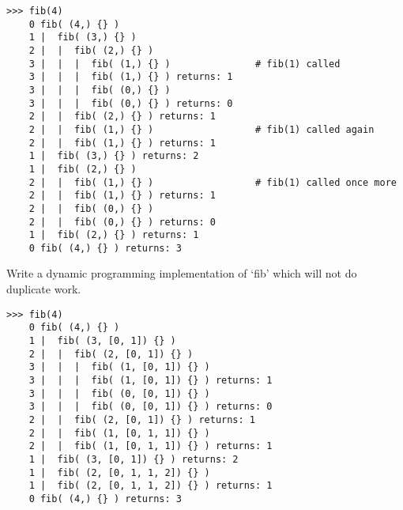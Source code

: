 \documentclass[11pt]{article}
\newenvironment{answer}{\large\lstset{basicstyle=\large}\color{white}}{}
\newenvironment{answer}{\large\lstset{basicstyle=\large}\color{red}}{}
\begin{document}
\begin{enumerate}
\begin{verbatim}
>>> fib(4)
    0 fib( (4,) {} )
    1 |  fib( (3,) {} )
    2 |  |  fib( (2,) {} )
    3 |  |  |  fib( (1,) {} )               # fib(1) called
    3 |  |  |  fib( (1,) {} ) returns: 1
    3 |  |  |  fib( (0,) {} )
    3 |  |  |  fib( (0,) {} ) returns: 0
    2 |  |  fib( (2,) {} ) returns: 1
    2 |  |  fib( (1,) {} )                  # fib(1) called again
    2 |  |  fib( (1,) {} ) returns: 1
    1 |  fib( (3,) {} ) returns: 2
    1 |  fib( (2,) {} )
    2 |  |  fib( (1,) {} )                  # fib(1) called once more
    2 |  |  fib( (1,) {} ) returns: 1
    2 |  |  fib( (0,) {} )
    2 |  |  fib( (0,) {} ) returns: 0
    1 |  fib( (2,) {} ) returns: 1
    0 fib( (4,) {} ) returns: 3
\end{verbatim}

      Write a dynamic programming implementation of `fib' which will not do
      duplicate work.

    \begin{answer}
    
\begin{verbatim}
>>> fib(4)
    0 fib( (4,) {} )
    1 |  fib( (3, [0, 1]) {} )
    2 |  |  fib( (2, [0, 1]) {} )
    3 |  |  |  fib( (1, [0, 1]) {} )
    3 |  |  |  fib( (1, [0, 1]) {} ) returns: 1
    3 |  |  |  fib( (0, [0, 1]) {} )
    3 |  |  |  fib( (0, [0, 1]) {} ) returns: 0
    2 |  |  fib( (2, [0, 1]) {} ) returns: 1
    2 |  |  fib( (1, [0, 1, 1]) {} )
    2 |  |  fib( (1, [0, 1, 1]) {} ) returns: 1
    1 |  fib( (3, [0, 1]) {} ) returns: 2
    1 |  fib( (2, [0, 1, 1, 2]) {} )
    1 |  fib( (2, [0, 1, 1, 2]) {} ) returns: 1
    0 fib( (4,) {} ) returns: 3
\end{verbatim}
    \end{answer}

\end{enumerate}
\end{document}
